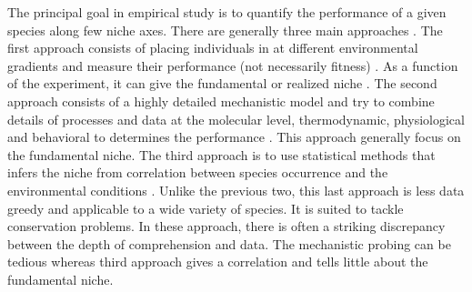 The principal goal in empirical study is to quantify the performance of a given species along few niche axes.
There are generally three main approaches \citep{Holt2009}.
The first approach consists of placing individuals in at different environmental gradients and measure their performance (not necessarily fitness) \citep{Birch1953, Elliott1982, Angert2005, Frazier2006}.
As a function of the experiment, it can give the fundamental or realized niche \citep{Birch1953, Elliott1982, Angert2005, Frazier2006}.
The second approach consists of a highly detailed mechanistic model and try to combine details of processes and data at the molecular level, thermodynamic, physiological and behavioral to determines the performance \citep{Kooijman2009, Kearney2009, Buckley2008}.
This approach generally focus on the fundamental niche.
The third approach is to use statistical methods that infers the niche from correlation between species occurrence and the environmental conditions \citep{Guisan2005, Austin2007, Elith2009}. %
Unlike the previous two, this last approach is less data greedy and applicable to a wide variety of species.
It is suited to tackle conservation problems.
In these approach, there is often a striking discrepancy between the depth of comprehension and data.
The mechanistic probing can be tedious whereas third approach gives a correlation and tells little about the fundamental niche.

